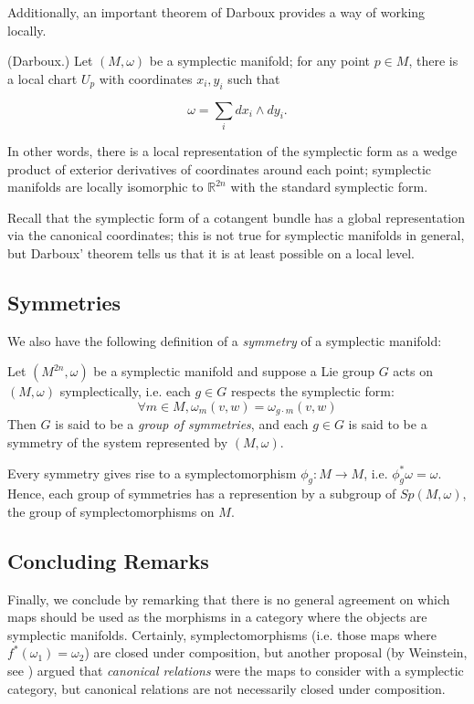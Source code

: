 Additionally, an important theorem of Darboux provides a way of working locally.
\begin{thrm}
(Darboux.) Let $(M,\omega)$ be a symplectic manifold; for any point $p \in M$, there is a local chart $U_p$ with coordinates $x_i,y_i$ such that 

$$\omega = \sum_i dx_i \wedge dy_i.$$

In other words, there is a local representation of the symplectic form as a wedge product of exterior derivatives of coordinates around each point; symplectic manifolds are locally isomorphic to $\mathbb{R}^{2n}$ with the standard symplectic form.
\end{thrm}
Recall that the symplectic form of a cotangent bundle has a global representation via the canonical coordinates; this is not true for symplectic manifolds in general, but Darboux' theorem tells us that it is at least possible on a local level.

\subsection{Symmetries}
We also have the following definition of a \emph{symmetry} of a symplectic manifold:
\begin{defn}
Let $(M^{2n},\omega)$ be a symplectic manifold and suppose a Lie group $G$ acts on $(M,\omega)$ symplectically, i.e. each $g \in G$ respects the symplectic form:
$$
\forall m \in M, \omega_m(v,w) = \omega_{g\cdot m}(v,w)
$$
Then $G$ is said to be a \emph{group of symmetries}, and each $g \in G$ is said to be a symmetry of the system represented by $(M,\omega)$.
\end{defn}

Every symmetry gives rise to a symplectomorphism $\phi_g : M \to M$, i.e. $\phi^*_g \omega = \omega$. Hence, each group of symmetries has a represention by a subgroup of $Sp(M,\omega)$, the group of symplectomorphisms on $M$.

\subsection{Concluding Remarks}
Finally, we conclude by remarking that there is no general agreement on which maps should be used as the morphisms in a category where the objects are symplectic manifolds. Certainly, symplectomorphisms (i.e. those maps where $f^*(\omega_1) = \omega_2$) are closed under composition, but another proposal (by Weinstein, see \cite{weinsteinCanonicalReln}) argued that \emph{canonical relations} were the maps to consider with a symplectic category, but canonical relations are not necessarily closed under composition.

